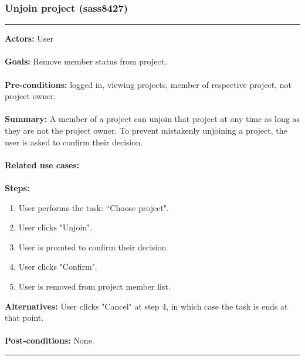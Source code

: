 \documentclass[11pt]{report}
\begin{document}
\subsubsection{Unjoin project (sass8427)}
\vspace{2pt}
\hrule
\vspace{8pt}
 \textbf{Actors:} User \\ \\
\textbf{Goals:} Remove member status from project. \\ \\
 \textbf{Pre-conditions:} logged in, viewing projects, member of respective project, not project owner.  \\ \\
\textbf{Summary:} A member of a project can unjoin that project at any time as long as they are not the project owner. To prevent mistakenly unjoining a project, the user is asked to confirm their decision.\\ \\
\textbf{Related use cases:} \\ \\
\textbf{Steps:} \begin{enumerate}
  \item User performs the task: ``Choose project".
  \item User clicks "Unjoin". 
  \item User is promted to confirm their decision
  \item User clicks "Confirm".
  \item User is removed from project member list.    
 \end{enumerate}
 \textbf{Alternatives:} User clicks "Cancel" at step 4, in which case the task is ends at that point. \\ \\
 \textbf{Post-conditions:} None. \\
\vspace{8pt}
\hrule
\newpage
\end{document}
